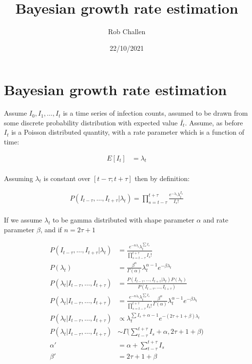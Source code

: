 \documentclass[
]{article}
\title{Bayesian growth rate estimation}
\author{Rob Challen}
\date{22/10/2021}
\begin{document}
\maketitle

\hypertarget{bayesian-growth-rate-estimation}{%
\section{Bayesian growth rate
estimation}\label{bayesian-growth-rate-estimation}}

Assume \(I_0, I_1, \dots, I_t\) is a time series of infection counts,
assumed to be drawn from some discrete probability distribution with
expected value \(\overline{I_t}\). Assume, as before \(I_t\) is a
Poisson distributed quantity, with a rate parameter which is a function
of time:

\[
\begin{aligned}
E[I_t] &= \lambda_t \\
\end{aligned}
\]

Assuming \(\lambda_t\) is constant over \([t-\tau;t+\tau]\) then by
definition:

\[
\begin{aligned}
P(I_{t-\tau},\dots,I_{t+\tau}|\lambda_t) = \prod_{s=t-\tau}^{t+\tau}\frac{e^{-\lambda_t}\lambda_t^{I_s}}{I_s!} \\
\end{aligned}
\]

If we assume \(\lambda_t\) to be gamma distributed with shape parameter
\(\alpha\) and rate parameter \(\beta\), and if \(n = 2\tau+1\)

\[
\begin{aligned}
P(I_{t-\tau},\dots,I_{t+\tau}|\lambda_t) &= \frac{e^{-n\lambda_t}\lambda_t^{\sum{I_s}}}{\prod_{s=t-\tau}^{t+\tau}I_s!} \\
P(\lambda_{t}) &= \frac{\beta^\alpha}{\Gamma(\alpha)} \lambda_{t}^{\alpha-1}e^{-\beta\lambda_{t}} \\
P(\lambda_t|I_{t-\tau},\dots,I_{t+\tau}) &= \frac{P(I_{t-\tau},\dots,I_{t+\tau}|\lambda_t)P(\lambda_{t})}{P(I_{t-\tau},\dots,I_{t+\tau})}\\
P(\lambda_t|I_{t-\tau},\dots,I_{t+\tau}) &= \frac{e^{-n\lambda_t}\lambda_t^{\sum{I_s}}}{\prod_{s=t-\tau}^{t+\tau}I_s!}\frac{\beta^\alpha}{\Gamma(\alpha)} \lambda_{t}^{\alpha-1}e^{-\beta\lambda_{t}}\\
P(\lambda_t|I_{t-\tau},\dots,I_{t+\tau}) &\propto \lambda_t^{\sum{I_s+\alpha-1}}e^{-(2\tau+1+\beta)\lambda_t} \\
P(\lambda_t|I_{t-\tau},\dots,I_{t+\tau}) &\sim \Gamma\big(\sum_{t-\tau}^{t+\tau}{I_s}+\alpha, 2\tau+1+\beta\big)\\
\alpha' &= \alpha+\sum_{t-\tau}^{t+\tau}{I_s}\\
\beta' &= 2\tau+1+\beta
\end{aligned}
\]
\end{document}
